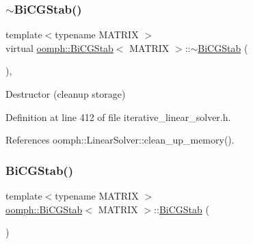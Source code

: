 \mbox{\label{classoomph_1_1BiCGStab_a79d6bd465113ebb2000d44bd08fcadc7}} 
\subsubsection{\texorpdfstring{$\sim$\+Bi\+C\+G\+Stab()}{~BiCGStab()}}
{\footnotesize\ttfamily template$<$typename M\+A\+T\+R\+IX $>$ \\
virtual \hyperlink{classoomph_1_1BiCGStab}{oomph\+::\+Bi\+C\+G\+Stab}$<$ M\+A\+T\+R\+IX $>$\+::$\sim$\hyperlink{classoomph_1_1BiCGStab}{Bi\+C\+G\+Stab} (\begin{DoxyParamCaption}{ }\end{DoxyParamCaption})\hspace{0.3cm}{\ttfamily [inline]}, {\ttfamily [virtual]}}



Destructor (cleanup storage) 



Definition at line 412 of file iterative\+\_\+linear\+\_\+solver.\+h.



References oomph\+::\+Linear\+Solver\+::clean\+\_\+up\+\_\+memory().

\mbox{\label{classoomph_1_1BiCGStab_a8b97ca7e38f6f39c47b3dcb2afc87a48}} 
\subsubsection{\texorpdfstring{Bi\+C\+G\+Stab()}{BiCGStab()}\hspace{0.1cm}{\footnotesize\ttfamily [2/2]}}
{\footnotesize\ttfamily template$<$typename M\+A\+T\+R\+IX $>$ \\
\hyperlink{classoomph_1_1BiCGStab}{oomph\+::\+Bi\+C\+G\+Stab}$<$ M\+A\+T\+R\+IX $>$\+::\hyperlink{classoomph_1_1BiCGStab}{Bi\+C\+G\+Stab} (\begin{DoxyParamCaption}\item[{const \hyperlink{classoomph_1_1BiCGStab}{Bi\+C\+G\+Stab}$<$ M\+A\+T\+R\+IX $>$ \&}]{ }\end{DoxyParamCaption})\hspace{0.3cm}{\ttfamily [inline]}}



